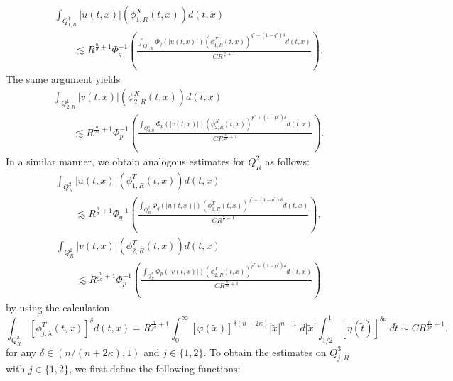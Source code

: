 \documentclass[11pt,reqno]{amsart}
\numberwithin{equation}{section}
\begin{document}
\begin{equation}\label{thr1.2_eq1}
\begin{aligned}
&\int_{Q^1_{1,R}}|u(t,x)|\left(\phi^{X}_{1,R}(t,x)\right)d(t,x)\\
&\qquad\lesssim R^{\frac{n}{\sigma}+1} \Phi_q^{-1}\left(\frac{\int_{Q^1_{1,R}}\Phi_q(|u(t,x)|)\left(\phi^{X}_{1,R}(t,x)\right)^{q^*+(1-q^*)\delta}d(t,x)}{CR^{\frac{n}{\sigma}+1}}\right).
\end{aligned}
\end{equation}
The same argument yields
\begin{equation}\label{thr1.2_eq2}
\begin{aligned}
&\int_{Q^1_{2,R}}|v(t,x)|\left(\phi^{X}_{2,R}(t,x)\right)d(t,x)\\
&\qquad \lesssim R^{\frac{n}{2\sigma}+1} \Phi_p^{-1}\left(\frac{\int_{Q^1_{2,R}}\Phi_p(|v(t,x)|)\left(\phi^{X}_{2,R}(t,x)\right)^{p^*+(1-p^*)\delta}d(t,x)}{CR^{\frac{n}{2\sigma}+1}}\right).
\end{aligned}
\end{equation}
In a similar manner, we obtain analogous estimates for $Q^2_{R}$ as follows:
\begin{equation}\label{thr1.2_eq3}
\begin{aligned}
&\int_{Q^2_{R}}|u(t,x)|\left(\phi^{T}_{1,R}(t,x)\right)d(t,x)\\
&\qquad\lesssim R^{\frac{n}{\sigma}+1} \Phi_q^{-1}\left(\frac{\int_{Q^2_{R}}\Phi_q(|u(t,x)|)\left(\phi^{T}_{1,R}(t,x)\right)^{q^*+(1-q^*)\delta}d(t,x)}{CR^{\frac{n}{\sigma}+1}}\right),
\end{aligned}
\end{equation}
\begin{equation}\label{thr1.2_eq4}
\begin{aligned}
&\int_{Q^2_{R}}|v(t,x)|\left(\phi^{T}_{2,R}(t,x)\right)d(t,x)\\
&\qquad\lesssim R^{\frac{n}{2\sigma}+1} \Phi_p^{-1}\left(\frac{\int_{Q^2_{R}}\Phi_p(|v(t,x)|)\left(\phi^{T}_{2,R}(t,x)\right)^{p^*+(1-p^*)\delta}d(t,x)}{CR^{\frac{n}{2\sigma}+1}}\right)
\end{aligned}
\end{equation}
by using the calculation
\[
\int_{Q^2_{R}}\left[\phi^{T}_{j,\lambda}(t,x)\right]^{\delta}d(t,x)=R^{\frac{n}{j\sigma}+1}\int_{0}^{\infty}[\varphi(\tilde{x})]^{\delta(n+2\kappa)}|\tilde{x}|^{n-1}\;d|\tilde{x}|\int_{1/2}^{1}[\eta(\tilde{t})]^{\delta \nu}\;d\tilde{t}\sim CR^{\frac{n}{j\sigma}+1}.
\]
for any $\delta\in (n/(n+2\kappa),1)$ and $j\in \{1,2\}$. To obtain the estimates on $Q^3_{j,R}$ with $j\in \{1,2\}$, we first define the following functions:
\end{document}
